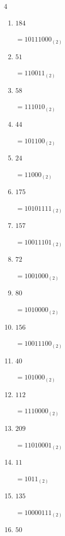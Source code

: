 \begin{multicols}{4}
\begin{enumerate}
        $=11000001_{(2)}$

  \item $184$

        $=10111000_{(2)}$

  \item $51$

        $=110011_{(2)}$

  \item $58$

        $=111010_{(2)}$

  \item $44$

        $=101100_{(2)}$

  \item $24$

        $=11000_{(2)}$

  \item $175$

        $=10101111_{(2)}$

  \item $157$

        $=10011101_{(2)}$

\columnbreak %

  \item $72$

        $=1001000_{(2)}$

  \item $80$

        $=1010000_{(2)}$

  \item $156$

        $=10011100_{(2)}$

  \item $40$

        $=101000_{(2)}$

  \item $112$

        $=1110000_{(2)}$

  \item $209$

        $=11010001_{(2)}$

  \item $11$

        $=1011_{(2)}$

  \item $135$

        $=10000111_{(2)}$

  \item $50$


\end{enumerate}
\end{multicols}
